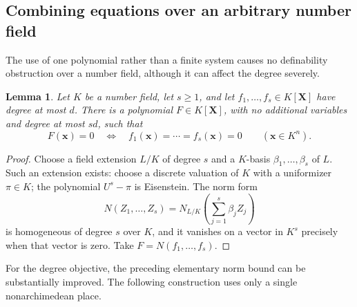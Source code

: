\documentclass[11pt]{article}
\newtheorem{lemma}[theorem]{Lemma}
\theoremstyle{definition}
\begin{document}
\subsection{Combining equations over an arbitrary number field}

The use of one polynomial rather than a finite system causes no
definability obstruction over a number field, although it can affect
the degree severely.

\begin{lemma}\label{lem:norm-combine}
Let $K$ be a number field, let $s\geq1$, and let
$f_1,\ldots,f_s\in K[\mathbf X]$ have degree at most $d$.
There is a polynomial $F\in K[\mathbf X]$, with no additional variables
and degree at most $sd$, such that
\[
 F(\mathbf x)=0\quad\Longleftrightarrow\quad
 f_1(\mathbf x)=\cdots=f_s(\mathbf x)=0
 \qquad(\mathbf x\in K^n).
\]
\end{lemma}
\begin{proof}
Choose a field extension $L/K$ of degree $s$ and a $K$-basis
$\beta_1,\ldots,\beta_s$ of $L$.  Such an extension exists: choose a
discrete valuation of $K$ with a uniformizer $\pi\in K$; the polynomial
$U^s-\pi$ is Eisenstein.  The norm form
\[
 N(Z_1,\ldots,Z_s)=
 N_{L/K}\!\left(\sum_{j=1}^s\beta_j Z_j\right)
\]
is homogeneous of degree $s$ over $K$, and it vanishes on a vector in
$K^s$ precisely when that vector is zero.  Take
$F=N(f_1,\ldots,f_s)$.
\end{proof}

For the degree objective, the preceding elementary norm bound can be
substantially improved.  The following construction uses only a single
nonarchimedean place.
\end{document}
